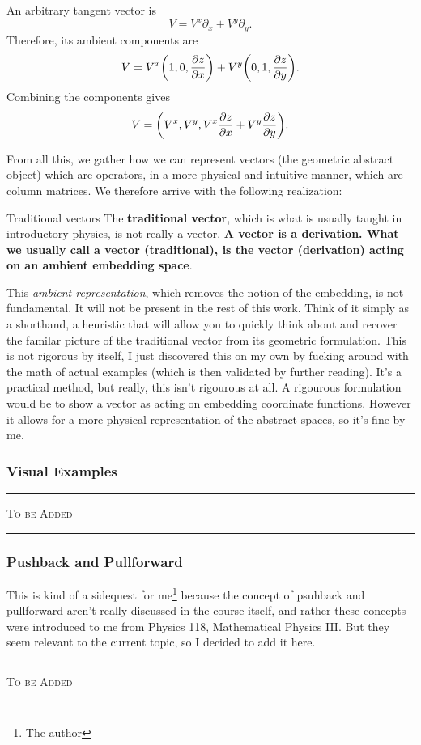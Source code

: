 \begin{enumerate}[(1)]
				An arbitrary tangent vector is
				\[
					V
					=
					V^x\partial_x
					+
					V^y\partial_y.
				\]
				Therefore, its ambient components are
				\[
					V
					=
					V^x
					\pqty{
						1,
						0,
						\pdv{z}{x}
					}
					+
					V^y
					\pqty{
						0,
						1,
						\pdv{z}{y}
					}.
				\]
				Combining the components gives
				\[
					V
					=
					\pqty{
						V^x,
						V^y,
						V^x\pdv{z}{x}
						+
						V^y\pdv{z}{y}
					}.
				\]
		\end{enumerate}

		From all this, we gather how we can represent vectors (the geometric abstract object) 
		which are operators, in a more physical and intuitive manner, which are column matrices. We therefore 
		arrive with the following realization:
		\begin{definition}{Traditional vectors}
		    The \textbf{traditional vector}, which is what is usually taught in introductory physics, is not 
			really a vector. \textbf{A vector is a derivation. What we usually call a vector (traditional), is the vector (derivation)
			acting on an ambient embedding space}.
		\end{definition}
		This \textit{ambient representation}, which removes the 
		notion of the embedding, is not fundamental.
		It will not be present in the rest of this work. Think of it simply
		as a shorthand, a heuristic that will allow you to quickly think about and recover
		the familar picture of the traditional vector from its geometric formulation. This is not rigorous by itself,
		I just discovered this on my own by fucking around with the math of actual examples
		(which is then validated by further reading). It's a practical method, but really, this isn't rigourous at all. A rigourous formulation
		would be to show a vector as acting on embedding coordinate functions. However it 
		allows for a more physical representation of the abstract spaces, so it's fine by me.
	\newpage
	\subsubsection{Visual Examples}
	\begin{center}
	    \hrule 

		{
			\color{red}
			\textsc{To be Added}
		}
		\vspace{1em}
		\hrule
	\end{center}
	\subsubsection{Pushback and Pullforward}
		This is kind of a sidequest for me\footnote{The author} because the 
		concept of psuhback and pullforward aren't really
		discussed in the course itself, and rather these concepts 
		were introduced to me from Physics 118, Mathematical Physics III.
		But they seem relevant to the current topic, so I decided 
		to add it here.
	\begin{center}
	    \hrule 

		{
			\color{red}
			\textsc{To be Added}
		}
		\vspace{1em}
		\hrule
	\end{center}
	\newpage
